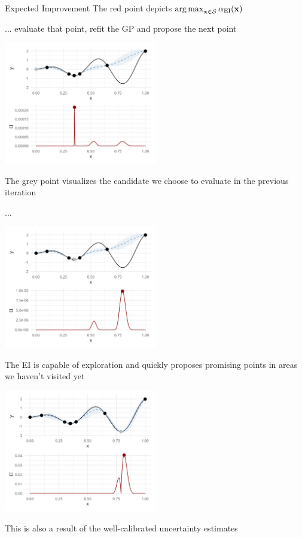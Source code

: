 \documentclass[11pt,compress,t,notes=noshow, xcolor=table]{beamer}
\begin{document}
\begin{vbframe}{Expected Improvement}
The red point depicts $\operatorname{arg\,max}_{\mathbf{x} \in \mathcal{S}} \alpha_{\text{EI}}(\mathbf{x})$

\framebreak

... evaluate that point, refit the GP and propose the next point

\begin{center}
  \includegraphics[width = 0.5\textwidth]{figure_man/bayesian_loop_5.png}
\end{center}

The grey point visualizes the candidate we choose to evaluate in the previous iteration

\framebreak

...

\begin{center}
  \includegraphics[width = 0.5\textwidth]{figure_man/bayesian_loop_6.png}
\end{center}

\framebreak

The EI is capable of exploration and quickly proposes promising points in areas we haven't visited yet

\begin{center}
  \includegraphics[width = 0.5\textwidth]{figure_man/bayesian_loop_7.png}
\end{center}

This is also a result of the well-calibrated uncertainty estimates

\end{vbframe}
\end{document}

